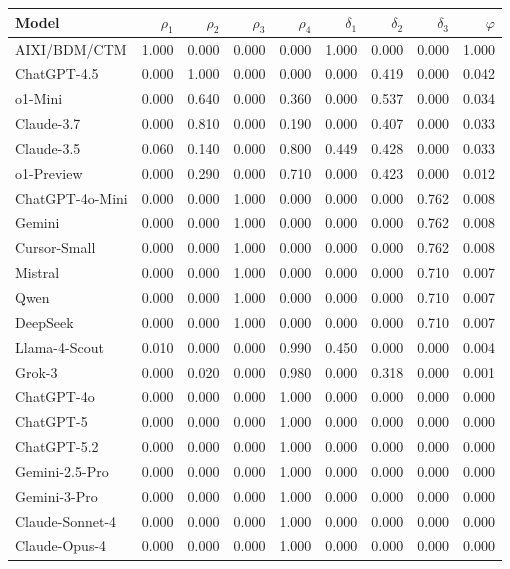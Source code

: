 \begin{tabular}{lrrrrrrrr}
\hline
Model & $\rho_1$ & $\rho_2$ & $\rho_3$ & $\rho_4$ & $\delta_1$ & $\delta_2$ & $\delta_3$ & $\varphi$ \\
\hline
AIXI/BDM/CTM & 1.000 & 0.000 & 0.000 & 0.000 & 1.000 & 0.000 & 0.000 & 1.000 \\
ChatGPT-4.5 & 0.000 & 1.000 & 0.000 & 0.000 & 0.000 & 0.419 & 0.000 & 0.042 \\
o1-Mini & 0.000 & 0.640 & 0.000 & 0.360 & 0.000 & 0.537 & 0.000 & 0.034 \\
Claude-3.7 & 0.000 & 0.810 & 0.000 & 0.190 & 0.000 & 0.407 & 0.000 & 0.033 \\
Claude-3.5 & 0.060 & 0.140 & 0.000 & 0.800 & 0.449 & 0.428 & 0.000 & 0.033 \\
o1-Preview & 0.000 & 0.290 & 0.000 & 0.710 & 0.000 & 0.423 & 0.000 & 0.012 \\
ChatGPT-4o-Mini & 0.000 & 0.000 & 1.000 & 0.000 & 0.000 & 0.000 & 0.762 & 0.008 \\
Gemini & 0.000 & 0.000 & 1.000 & 0.000 & 0.000 & 0.000 & 0.762 & 0.008 \\
Cursor-Small & 0.000 & 0.000 & 1.000 & 0.000 & 0.000 & 0.000 & 0.762 & 0.008 \\
Mistral & 0.000 & 0.000 & 1.000 & 0.000 & 0.000 & 0.000 & 0.710 & 0.007 \\
Qwen & 0.000 & 0.000 & 1.000 & 0.000 & 0.000 & 0.000 & 0.710 & 0.007 \\
DeepSeek & 0.000 & 0.000 & 1.000 & 0.000 & 0.000 & 0.000 & 0.710 & 0.007 \\
Llama-4-Scout & 0.010 & 0.000 & 0.000 & 0.990 & 0.450 & 0.000 & 0.000 & 0.004 \\
Grok-3 & 0.000 & 0.020 & 0.000 & 0.980 & 0.000 & 0.318 & 0.000 & 0.001 \\
ChatGPT-4o & 0.000 & 0.000 & 0.000 & 1.000 & 0.000 & 0.000 & 0.000 & 0.000 \\
ChatGPT-5 & 0.000 & 0.000 & 0.000 & 1.000 & 0.000 & 0.000 & 0.000 & 0.000 \\
ChatGPT-5.2 & 0.000 & 0.000 & 0.000 & 1.000 & 0.000 & 0.000 & 0.000 & 0.000 \\
Gemini-2.5-Pro & 0.000 & 0.000 & 0.000 & 1.000 & 0.000 & 0.000 & 0.000 & 0.000 \\
Gemini-3-Pro & 0.000 & 0.000 & 0.000 & 1.000 & 0.000 & 0.000 & 0.000 & 0.000 \\
Claude-Sonnet-4 & 0.000 & 0.000 & 0.000 & 1.000 & 0.000 & 0.000 & 0.000 & 0.000 \\
Claude-Opus-4 & 0.000 & 0.000 & 0.000 & 1.000 & 0.000 & 0.000 & 0.000 & 0.000 \\

\end{tabular}
